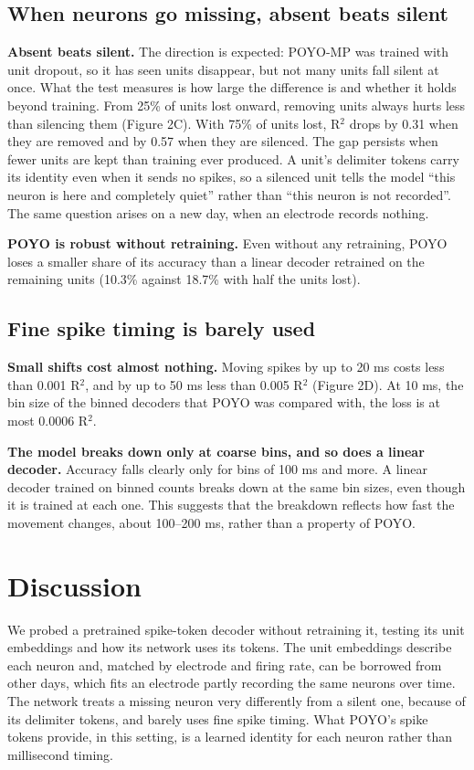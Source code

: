 \documentclass[11pt]{article}
\begin{document}
\subsection{When neurons go missing, absent beats silent}

\textbf{Absent beats silent.} The direction is expected: POYO-MP was trained with unit dropout, so it has seen units disappear, but not many units fall silent at once. What the test measures is how large the difference is and whether it holds beyond training. From 25\% of units lost onward, removing units always hurts less than silencing them (Figure 2C). With 75\% of units lost, R$^{2}$ drops by 0.31 when they are removed and by 0.57 when they are silenced. The gap persists when fewer units are kept than training ever produced. A unit's delimiter tokens carry its identity even when it sends no spikes, so a silenced unit tells the model ``this neuron is here and completely quiet'' rather than ``this neuron is not recorded''. The same question arises on a new day, when an electrode records nothing.

\textbf{POYO is robust without retraining.} Even without any retraining, POYO loses a smaller share of its accuracy than a linear decoder retrained on the remaining units (10.3\% against 18.7\% with half the units lost).

\subsection{Fine spike timing is barely used}

\textbf{Small shifts cost almost nothing.} Moving spikes by up to 20 ms costs less than 0.001 R$^{2}$, and by up to 50 ms less than 0.005 R$^{2}$ (Figure 2D). At 10 ms, the bin size of the binned decoders that POYO was compared with, the loss is at most 0.0006 R$^{2}$.

\textbf{The model breaks down only at coarse bins, and so does a linear decoder.} Accuracy falls clearly only for bins of 100 ms and more. A linear decoder trained on binned counts breaks down at the same bin sizes, even though it is trained at each one. This suggests that the breakdown reflects how fast the movement changes, about 100--200 ms, rather than a property of POYO.

\section{Discussion}

We probed a pretrained spike-token decoder without retraining it, testing its unit embeddings and how its network uses its tokens. The unit embeddings describe each neuron and, matched by electrode and firing rate, can be borrowed from other days, which fits an electrode partly recording the same neurons over time. The network treats a missing neuron very differently from a silent one, because of its delimiter tokens, and barely uses fine spike timing. What POYO's spike tokens provide, in this setting, is a learned identity for each neuron rather than millisecond timing.
\end{document}
